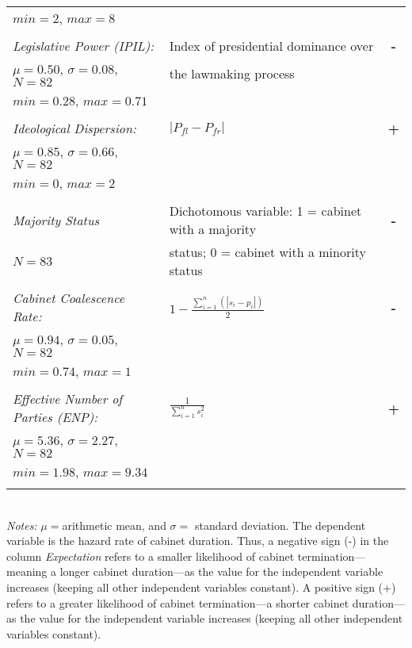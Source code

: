 \documentclass[12pt,a4paper]{article}
\begin{document}
\begin{table}[!htbp]
\begin{tabular}{llc}
$min=2$, $max=8$ &&\\
\\
\emph{Legislative Power (IPIL):} & Index of presidential dominance over  & \textbf{-} \\
$\mu=0.50$, $\sigma=0.08$, $N=82$ & the lawmaking process &\\
$min=0.28$, $max=0.71$ &&\\
\\
\emph{Ideological Dispersion:} & $|P_{fl} - P_{fr}|$  & \textbf{+} \\
$\mu=0.85$, $\sigma=0.66$, $N=82$ &&\\
$min=0$, $max=2$ &&\\
\\
\emph{Majority Status}  & Dichotomous variable: 1 = cabinet with a majority   & \textbf{-} \\
$N=83$ & status; 0 = cabinet with a minority status & \\
\\
\emph{Cabinet Coalescence Rate:} & $1 - \frac{\sum_{i=1}^n (|s_{i} - p_{i}|)}{2}$  & \textbf{-} \\
$\mu=0.94$, $\sigma=0.05$, $N=82$ &&\\
$min=0.74$, $max=1$ &&\\
\\
\emph{Effective Number of Parties (ENP):}  & $\frac{1}{\sum_{i=1}^{n}s_{i}^{2}}$  & \textbf{+} \\
$\mu=5.36$, $\sigma=2.27$, $N=82$ &&\\
$min=1.98$, $max=9.34$ &&\\
\\
\hline 
\end{tabular} 
\\
\tiny{\emph{Notes:} $\mu=$arithmetic mean, and $\sigma=$ standard deviation. The dependent variable is the hazard rate of cabinet duration. Thus, a negative sign (-) in the column \emph{Expectation} refers to a smaller likelihood of cabinet termination---meaning a longer cabinet duration---as the value for the independent variable increases (keeping all other independent variables constant). A positive sign (+) refers to a greater likelihood of cabinet termination---a shorter cabinet duration---as the value for the independent variable increases (keeping all other independent variables constant).}
\end{table} 
\end{document}
